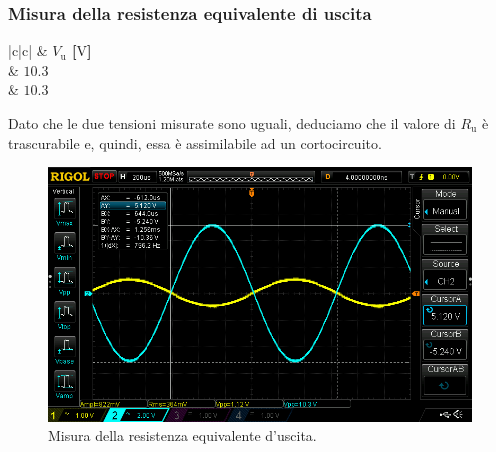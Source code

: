 \documentclass[a4paper]{article}
\begin{document}
			\subsubsection{Misura della resistenza equivalente di uscita}	
				\begin{center}
					\begin{tabular}{ |c|c| }
						\hline
						\multirow{} 				   		  & \textbf{$ V_{\mathrm{u}} $ [$ \mathrm{V} $]} \\
						\hline
						 		  & $ 10.3 $ \\
						 & $ 10.3 $ \\
						\hline
					\end{tabular}
				\end{center}
				Dato che le due tensioni misurate sono uguali, deduciamo che il valore di $ R_{\mathrm{u}} $ è trascurabile e, quindi, essa è assimilabile ad un cortocircuito.
				\begin{figure}[h!]
					\centering
					\includegraphics[scale=0.2]{misuraDellaResistenzaEquivalenteInIngressoAmplificatoreInvertenteR9InCorto}
					\caption{Misura della resistenza equivalente d'uscita.}
					\label{fig:misuraDellaResistenzaEquivalenteDiUscitaAmplificatoreInvertente}
				\end{figure}
\end{document}
